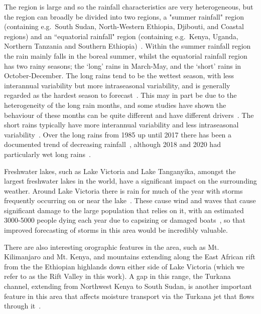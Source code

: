 \documentclass{article}
\begin{document}
The region is large and so the rainfall characteristics are very heterogeneous, but the region can broadly be divided into two regions, a "summer rainfall" region (containing e.g.~South Sudan, North-Western Ethiopia, Djibouti, and Coastal regions) and an ``equatorial rainfall" region (containing e.g.~Kenya, Uganda, Northern Tanzania and Southern Ethiopia)~\citep{nicholson_climate_2017}. Within the summer rainfall region the rain mainly falls in the boreal summer, whilst the equatorial rainfall region has two rainy seasons; the `long' rains in March-May, and the `short' rains in October-December. The long rains tend to be the wettest season, with less interannual variability but more intraseasonal variability, and is generally regarded as the hardest season to forecast~\citep{nicholson_climate_2017, walker_skill_2019, kilavi_extreme_2018}. This may in part be due to the heterogeneity of the long rain months, and some studies have shown the behaviour of these months can be quite different and have different drivers~\citep{camberlin_east_2002}. The short rains typically have more interannual variability and less intraseasonal variability~\citep{black_observational_2003}. Over the long rains from 1985 up until 2017 there has been a documented trend of decreasing rainfall~\citep{wainwright_eastern_2019, liebmann_understanding_2014}, although 2018 and 2020 had particularly wet long rains~\citep{palmer_drivers_2023}.

Freshwater lakes, such as Lake Victoria and Lake Tanganyika, amongst the largest freshwater lakes in the world, have a significant impact on the surrounding weather. Around Lake Victoria there is rain for much of the year with storms frequently occurring on or near the lake~\citep{macleod_drivers_2021, chamberlain_forecasting_2014, woodhams_identifying_2019}. These cause wind and waves that cause significant damage to the large population that relies on it, with an estimated 3000-5000 people dying each year due to capsizing or damaged boats~\citep{ifrc_world_2014}, so that improved forecasting of storms in this area would be incredibly valuable. 

There are also interesting orographic features in the area, such as Mt. Kilimanjaro and Mt. Kenya, and mountains extending along the East African rift from the the Ethiopian highlands down either side of Lake Victoria (which we refer to as the Rift Valley in this work). A gap in this range, the Turkana channel, extending from Northwest Kenya to South Sudan, is another important feature in this area that affects moisture transport via the Turkana jet that flows through it~\citep{nicholson_turkana_2016}.
\end{document}
